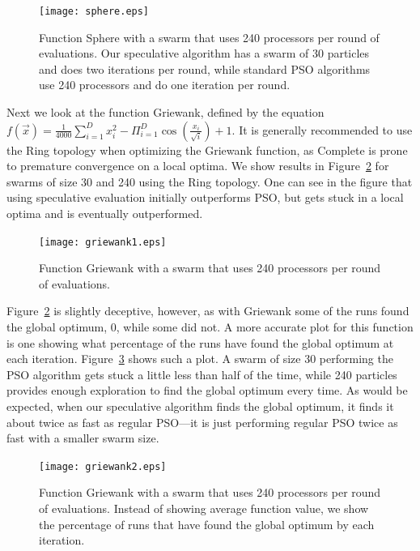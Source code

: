\documentclass[journal,letterpaper]{IEEEtran}
\newcommand{\fig}[1]{Figure~\ref{fig:#1}}
\begin{document}
\begin{figure}
  \centering
  \texttt{[image: sphere.eps]}
  \caption{Function Sphere with a swarm that uses 240 processors per round of
  evaluations.  Our speculative algorithm has a swarm of 30 particles and does
  two iterations per round, while standard PSO algorithms use 240 processors
  and do one iteration per round.}
  \label{fig:basic-sphere}
\end{figure}

Next we look at the function Griewank, defined by the equation $f(\Vec{x}) =
\frac{1}{4000} \sum_{i=1}^D x_i^2 - \Pi_{i=1}^D \cos\left(\frac{x_i}{\sqrt{i}}
\right) + 1$.  It is generally recommended to use the Ring topology when
optimizing the Griewank function, as Complete is prone to premature convergence
on a local optima.  We show results in \fig{basic-griewank1} for swarms of size
30 and 240 using the Ring topology. One can see in the figure that using
speculative evaluation initially outperforms PSO, but gets stuck in a local
optima and is eventually outperformed.  

\begin{figure}
  \centering
  \texttt{[image: griewank1.eps]}
  \caption{Function Griewank with a swarm that uses 240 processors per round of
  evaluations.}
  \label{fig:basic-griewank1}
\end{figure}

\fig{basic-griewank1} is slightly deceptive, however, as with Griewank some of
the runs found the global optimum, 0, while some did not.  A more accurate plot
for this function is one showing what percentage of the runs have found the
global optimum at each iteration.  \fig{basic-griewank2} shows such a plot.  A
swarm of size 30 performing the PSO algorithm gets stuck a little less than
half of the time, while 240 particles provides enough exploration to find the
global optimum every time.  As would be expected, when our speculative
algorithm finds the global optimum, it finds it about twice as fast as regular
PSO---it is just performing regular PSO twice as fast with a smaller swarm
size.

\begin{figure}
  \centering
  \texttt{[image: griewank2.eps]}
  \caption{Function Griewank with a swarm that uses 240 processors per round of
  evaluations.  Instead of showing average function value, we show the
  percentage of runs that have found the global optimum by each iteration.}
  \label{fig:basic-griewank2}
\end{figure}
\end{document}

